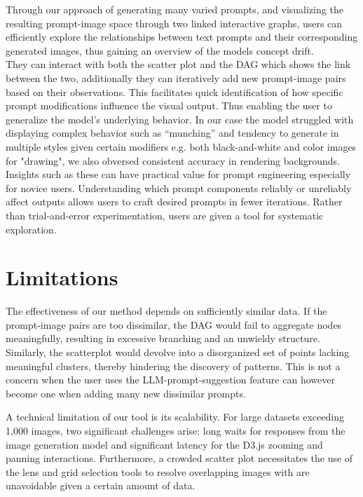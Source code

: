 \documentclass[
  a4paper,  %
  twoside,  %
  bibliography=totoc,
  headsepline,
  cleardoublepage=empty,
  parskip=half,
  draft=false
]{scrbook}
\begin{document}
Through our approach of generating many varied prompts, and visualizing the resulting prompt-image space through two linked interactive graphs, users can efficiently explore the relationships between text prompts and their corresponding generated images, thus gaining an overview of the models concept drift.\\ They can interact with both the scatter plot and the DAG which shows the link between the two, additionally they can iteratively add new prompt-image pairs based on their observations. This facilitates quick identification of how specific prompt modifications influence the visual output. Thus enabling the user to generalize the model's underlying behavior. In our case the model struggled with displaying complex behavior such as \enquote{munching} and tendency to generate in multiple styles given certain modifiers e.g. both black-and-white and color images for "drawing", we also obversed consistent accuracy in rendering backgrounds. \\ Insights such as these can have practical value for prompt engineering especially for novice users. Understanding which prompt components reliably or unreliably affect outputs allows users to craft desired prompts in fewer iterations. Rather than trial-and-error experimentation, users are given a tool for systematic exploration.
\section{Limitations}
The effectiveness of our method depends on sufficiently similar data. If the prompt-image pairs are too dissimilar, the DAG would fail to aggregate nodes meaningfully, resulting in excessive branching and an unwieldy structure. Similarly, the scatterplot would devolve into a disorganized set of points lacking meaningful clusters, thereby hindering the discovery of patterns. This is not a concern when the user uses the LLM-prompt-suggestion feature can however become one when adding many new dissimilar prompts.


A technical limitation of our tool is its scalability. For large datasets exceeding 1,000 images, two significant challenges arise: long waits for responses from the image generation model and significant latency for the D3.js zooming and panning interactions. Furthermore, a crowded scatter plot necessitates the use of the lens and grid selection tools to resolve overlapping images with are unavoidable given a certain amount of data.
\end{document}
